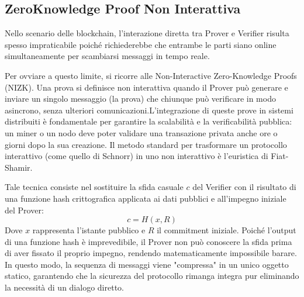 \subsection{ZeroKnowledge Proof Non Interattiva}
Nello scenario delle blockchain, l'interazione diretta tra Prover e Verifier risulta spesso impraticabile poiché richiederebbe che entrambe le parti siano online simultaneamente per scambiarsi messaggi in tempo reale. 

Per ovviare a questo limite, si ricorre alle Non-Interactive Zero-Knowledge Proofs (NIZK). Una prova si definisce non interattiva quando il Prover può generare e inviare un singolo messaggio (la prova) che chiunque può verificare in modo asincrono, senza ulteriori comunicazioni.L'integrazione di queste prove in sistemi distribuiti è fondamentale per garantire la scalabilità e la verificabilità pubblica: un miner o un nodo deve poter validare una transazione privata anche ore o giorni dopo la sua creazione. Il metodo standard per trasformare un protocollo interattivo (come quello di Schnorr) in uno non interattivo è l'euristica di Fiat-Shamir. 

Tale tecnica consiste nel sostituire la sfida casuale $c$ del Verifier con il risultato di una funzione hash crittografica applicata ai dati pubblici e all'impegno iniziale del Prover:
\[c = H(x, R)\]
Dove $x$ rappresenta l'istante pubblico e $R$ il commitment iniziale. 
Poiché l'output di una funzione hash è imprevedibile, il Prover non può conoscere la sfida prima di aver fissato il proprio impegno, rendendo matematicamente impossibile barare. In questo modo, la sequenza di messaggi viene "compressa" in un unico oggetto statico, garantendo che la sicurezza del protocollo rimanga integra pur eliminando la necessità di un dialogo diretto.

